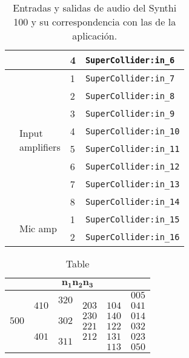 \begin{table}
\begin{center}
\begin{tabular}{|l|l|l|l| }
			 & & 4 & \texttt{SuperCollider:in\_6}\\			
			 \hline
			 \hline
			\multirow{8}{*}{} &  \multirow{8}{*}{\parbox{5em}{  Input\\ amplifiers}}
			 & 1 & \texttt{SuperCollider:in\_7}\\			
			 & & 2 & \texttt{SuperCollider:in\_8}\\			
			 & & 3 & \texttt{SuperCollider:in\_9}\\			
			 & & 4 & \texttt{SuperCollider:in\_10}\\			
			 & & 5 & \texttt{SuperCollider:in\_11}\\			
			 & & 6 & \texttt{SuperCollider:in\_12}\\			
			 & & 7 & \texttt{SuperCollider:in\_13}\\			
			 & & 8 & \texttt{SuperCollider:in\_14}\\		
			\cline{2-4}
			 \multirow{2}{*}{} &  \multirow{2}{*}{Mic amp}
			 & 1 & \texttt{SuperCollider:in\_15}\\			
			 & & 2 & \texttt{SuperCollider:in\_16}\\			
			 \hline
		\end{tabular}
		\caption[Entradas y salidas de la aplicación]{Entradas y salidas de audio del Synthi 100 y su correspondencia con las de la aplicación.}
		\label{table:outputs_outputs}
	\end{center}
\end{table}


\begin{table}
	\begin{center}
		\begin{tabular}{|c|c|c|c|c|c|} \hline
			\multicolumn{6}{|c|}{$\mathbf{n_1n_2n_3}$}\\ \hline
			\multirow{6}{*}{$500$} & \multirow{3}{*}{$410$} & \multirow{2}{*}{$320$} & {} & {}& $005$\\
			{} & {} & {} & $203$ & $104$ & $041$\\
			{} & {} & \multirow{2}{*}{$302$} & $230$ & $140$ & $014$\\
			{} & \multirow{3}{*}{$401$} & {} & $221$ & $122$ & $032$\\
			{} & {} & \multirow{2}{*}{$311$} & $212$ & $131$ & $023$\\
			{} & {} & {} & {} & $113$ & $050$\\
			\hline
		\end{tabular}
	\end{center}
	\caption{Table}
	\label{tab:matrix}
\end{table}
